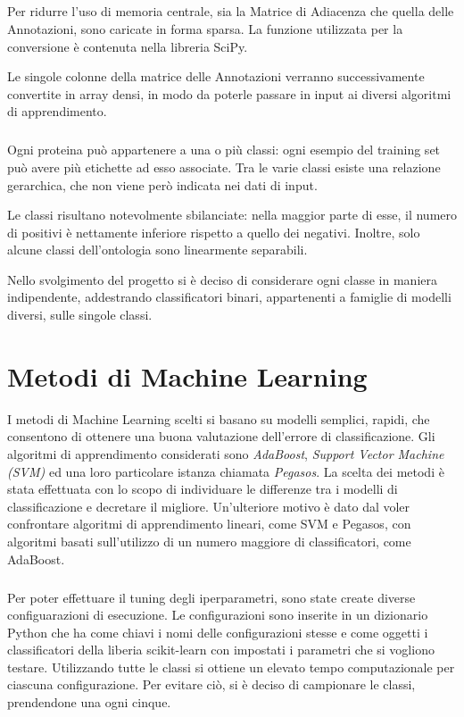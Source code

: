 \documentclass[12pt,a4paper,oneside,hidelinks]{report}
\begin{document}
\paragraph*{} 
Per ridurre l'uso di memoria centrale, sia la Matrice di Adiacenza che quella delle Annotazioni, sono caricate in forma sparsa. La funzione utilizzata per la conversione è contenuta nella libreria SciPy.

Le singole colonne della matrice delle Annotazioni verranno successivamente convertite in array densi, in modo da poterle passare in input ai diversi algoritmi di apprendimento. 

\paragraph*{}
Ogni proteina può appartenere a una o più classi: ogni esempio del training set può avere più etichette ad esso associate. Tra le varie classi esiste una relazione gerarchica, che non viene però indicata nei dati di input.

Le classi risultano notevolmente sbilanciate: nella maggior parte di esse, il numero di positivi è nettamente inferiore rispetto a quello dei negativi. Inoltre, solo alcune classi dell'ontologia sono linearmente separabili. 

Nello svolgimento del progetto si è deciso di considerare ogni classe in maniera indipendente, addestrando classificatori binari, appartenenti a famiglie di modelli diversi, sulle singole classi.


\chapter{Metodi di Machine Learning} 
\label{chap:metodi}

I metodi di Machine Learning scelti si basano su modelli semplici, rapidi, che consentono di ottenere una buona valutazione dell'errore di classificazione. Gli algoritmi di apprendimento considerati sono \textit{AdaBoost}, \textit{Support Vector Machine (SVM)} ed una loro particolare istanza chiamata \textit{Pegasos}. La scelta dei metodi è stata effettuata con lo scopo di individuare le differenze tra i modelli di classificazione e decretare il migliore. Un'ulteriore motivo è dato dal voler confrontare algoritmi di apprendimento lineari, come SVM e Pegasos, con algoritmi basati sull'utilizzo di un numero maggiore di classificatori, come AdaBoost.

\paragraph*{}
Per poter effettuare il tuning degli iperparametri, sono state create diverse configuarazioni di esecuzione.
Le configurazioni sono inserite in un dizionario Python che ha come chiavi i nomi delle configurazioni stesse e come oggetti i classificatori della liberia scikit-learn con impostati i parametri che si vogliono testare.
Utilizzando tutte le classi si ottiene un elevato tempo computazionale per ciascuna configurazione. Per evitare ciò, si è deciso di campionare le classi, prendendone una ogni cinque.
 
\end{document}
